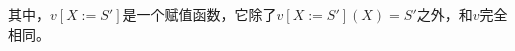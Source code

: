 \documentclass[9pt, CJK]{beamer}
\begin{document}
\begin{frame}
{\begin{definition}
	其中，$v[X:= S']$是一个赋值函数，它除了$v[X:= S'](X)=S'$之外，和$v$完全相同。
\end{definition}
}
\end{frame}
\end{document}
